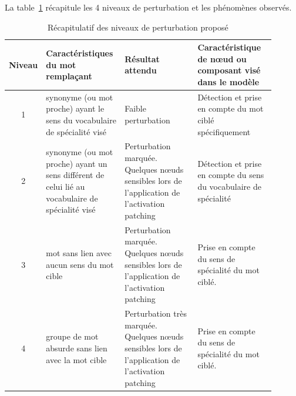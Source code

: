         La table~\ref{tab:niveauxPerturbation} récapitule les 4 niveaux de perturbation et les phénomènes observés.

        \begin{table}
            \centering

            \begin{tabular}{|c|p{0.3\linewidth}|p{0.3\linewidth}|p{0.3\linewidth}|}
                \hline
                 Niveau & Caractéristiques du mot remplaçant & Résultat attendu  & Caractéristique de nœud ou composant visé dans le modèle \\
                 \hline 
                 \hline
                 1 & synonyme (ou mot proche) ayant le sens du vocabulaire de spécialité visé & Faible perturbation &  Détection et prise en compte du mot ciblé spécifiquement \\
                 \hline
                 2 & synonyme (ou mot proche) ayant un sens différent de celui lié au vocabulaire de spécialité visé & Perturbation marquée. Quelques nœuds sensibles lors de l'application de l'activation patching & Détection et prise en compte du sens du vocabulaire de spécialité \\
                 \hline
                 3 & mot sans lien avec aucun sens du mot cible & Perturbation marquée. Quelques nœuds sensibles lors de l'application de l'activation patching & Prise en compte du sens de spécialité du mot ciblé. \\
                 \hline
                 4 & groupe de mot absurde sans lien avec la mot cible & Perturbation très marquée. Quelques nœuds sensibles lors de l'application de l'activation patching & Prise en compte du sens de spécialité du mot ciblé. \\
                 \hline
            \end{tabular}
            
            \caption{Récapitulatif des niveaux de perturbation proposé}
            \label{tab:niveauxPerturbation}
        \end{table}


